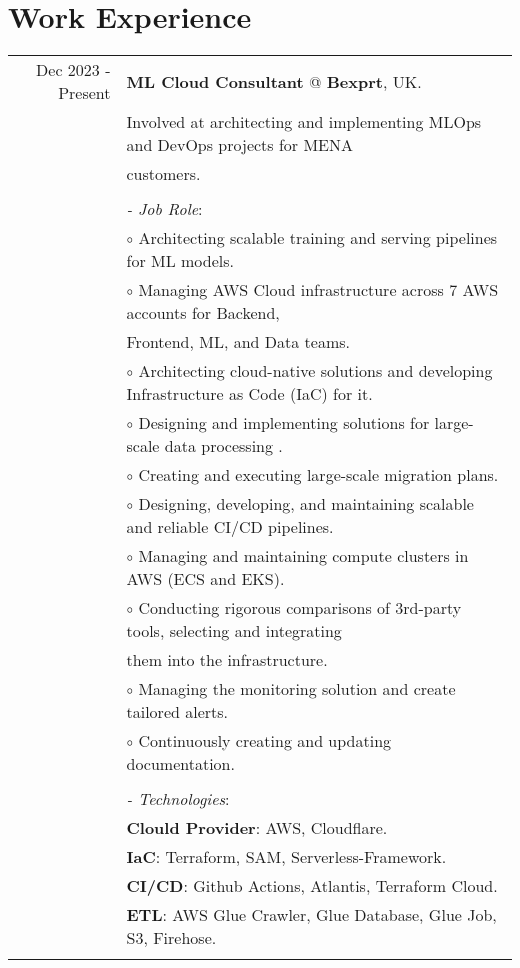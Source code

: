\documentclass[a4paper,10pt]{article}
\begin{document}
\section{\textbf{Work Experience}}
\begin{longtable}{r|l}
    Dec 2023 - Present& \textbf{ML Cloud Consultant} @
    \textbf{Bexprt}, UK. \\&
    Involved at architecting and implementing MLOps and DevOps projects for MENA \\& customers. \\&
    \\&
    \textit{- Job Role}:\\&
    $\circ$ Architecting scalable training and serving pipelines for ML models. \\ &
    $\circ$ Managing AWS Cloud infrastructure across 7 AWS accounts for Backend,\\ & Frontend, ML, and Data teams. \\ &
    $\circ$ Architecting cloud-native solutions and developing Infrastructure as Code (IaC) for it. \\ &
    $\circ$ Designing and implementing solutions for large-scale data processing . \\ &
    $\circ$ Creating and executing large-scale migration plans. \\ &
    $\circ$ Designing, developing, and maintaining scalable and reliable CI/CD pipelines. \\ &
    $\circ$ Managing and maintaining compute clusters in AWS (ECS and EKS). \\ &
    $\circ$ Conducting rigorous comparisons of 3rd-party tools, selecting and integrating \\ & them into the infrastructure. \\ &
    $\circ$ Managing the monitoring solution and create tailored alerts. \\ &
    $\circ$ Continuously creating and updating documentation. \\ &
    \\&
    \textit{- Technologies}:\\&
    \textbf{Clould Provider}: AWS, Cloudflare. \\&
    \textbf{IaC}: Terraform, SAM, Serverless-Framework. \\&
    \textbf{CI/CD}: Github Actions, Atlantis, Terraform Cloud. \\&
    \textbf{ETL}: AWS Glue Crawler, Glue Database, Glue Job, S3, Firehose. \\&

\end{longtable}
\end{document}
